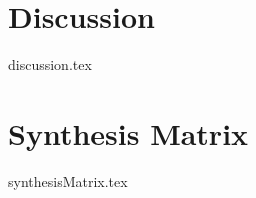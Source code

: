 \documentclass[print,ms]{unothesis}
\begin{document}
\chapter{Discussion}
{discussion.tex}

\backmatter

\nocite{*}



\appendix
\chapter{Synthesis Matrix}
{synthesisMatrix.tex}
\end{document}
